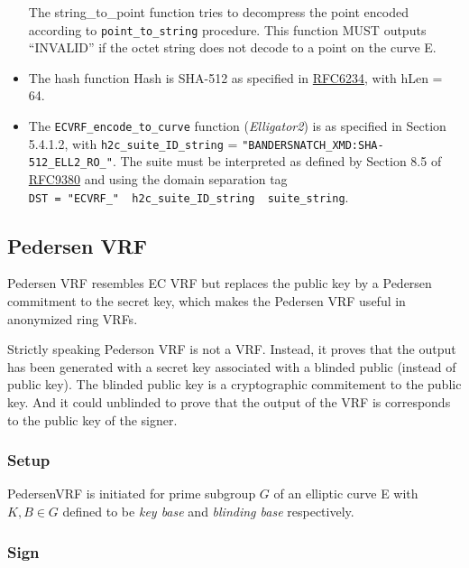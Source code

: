 \documentclass[
]{article}
\begin{document}
\begin{itemize}
  The string\_to\_point function tries to decompress the point encoded
  according to \texttt{point\_to\_string} procedure. This function MUST
  outputs ``INVALID'' if the octet string does not decode to a point on
  the curve E.
\item
  The hash function Hash is SHA-512 as specified in
  \href{https://www.rfc-editor.org/rfc/rfc6234}{RFC6234}, with hLen =
  64.
\item
  The \texttt{ECVRF\_encode\_to\_curve} function (\emph{Elligator2}) is
  as specified in Section 5.4.1.2, with \texttt{h2c\_suite\_ID\_string}
  = \texttt{"BANDERSNATCH\_XMD:SHA-512\_ELL2\_RO\_"}. The suite must be
  interpreted as defined by Section 8.5 of
  \href{https://datatracker.ietf.org/doc/rfc9380/}{RFC9380} and using
  the domain separation tag
  \texttt{DST\ =\ "ECVRF\_"\ \textbar{}\textbar{}\ h2c\_suite\_ID\_string\ \textbar{}\textbar{}\ suite\_string}.
\end{itemize}

\hypertarget{pedersen-vrf}{%
\subsection{Pedersen VRF}\label{pedersen-vrf}}

Pedersen VRF resembles EC VRF but replaces the public key by a Pedersen
commitment to the secret key, which makes the Pedersen VRF useful in
anonymized ring VRFs.

Strictly speaking Pederson VRF is not a VRF. Instead, it proves that the
output has been generated with a secret key associated with a blinded
public (instead of public key). The blinded public key is a
cryptographic commitement to the public key. And it could unblinded to
prove that the output of the VRF is corresponds to the public key of the
signer.

\hypertarget{setup}{%
\subsubsection{Setup}\label{setup}}

PedersenVRF is initiated for prime subgroup \(G\) of an elliptic curve E
with \(K, B \in G\) defined to be \emph{key base} and \emph{blinding
base} respectively.

\hypertarget{sign}{%
\subsubsection{Sign}\label{sign}}
\end{document}
